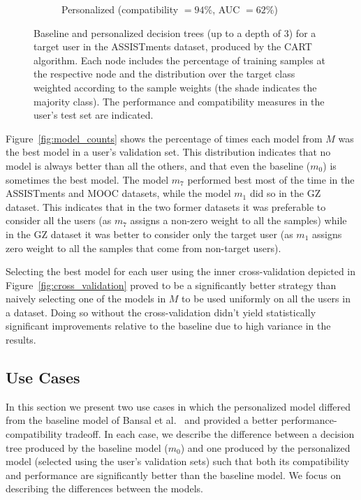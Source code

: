 \documentclass[letterpaper]{article}
\theoremstyle{definition}
\begin{document}
\begin{figure}[t]
\begin{subfigure}[b]{.6\textwidth}
\caption{Personalized (compatibility $=94\%$, AUC $=62\%$)}
\label{fig:assistments_personalized}
\end{subfigure}
\caption{Baseline and personalized decision trees (up to a depth of 3) for a target user in the ASSISTments dataset,  produced by the CART algorithm.  Each node includes  the percentage of training samples at the respective node and the distribution over the target class weighted according to the sample weights (the shade indicates the majority class). The performance and compatibility measures in the user's test set are indicated.}
\label{fig:user_case_assistments}
\end{figure}

Figure~\ref{fig:model_counts} shows the percentage of times each model from $M$ was the best model in a user's validation set. This distribution indicates that no model is always better than all the others, and that even the baseline ($m_0$) is sometimes the best model.
The model $m_7$ performed best most of the time in the ASSISTments and MOOC datasets, while the model $m_1$ did so in the GZ dataset. This indicates that in the two former datasets it was preferable to consider all the users (as $m_7$ assigns a non-zero weight to all the samples) while in the GZ dataset it was better to consider only the target user (as $m_1$ assigns zero weight to all the samples that come from non-target users).

Selecting the best model for each user using the inner cross-validation depicted in Figure~\ref{fig:cross_validation} proved to be a significantly better strategy than naively selecting one of the models in $M$ to be used uniformly on all the users in a dataset. Doing so without the cross-validation didn't yield statistically significant improvements relative to the baseline due to high variance in the results.

\subsection{Use Cases}
\label{sec:user_cases}
In this section we present two use cases in which the personalized model differed from the baseline model of Bansal et al.~ and provided a better performance-compatibility tradeoff.
In each case, we describe the difference between a decision tree produced by the baseline model ($m_0$) and one produced by the personalized model (selected using the user's validation sets) such that both its compatibility and performance are significantly better than the baseline model.
We focus on describing the differences between the models.
\end{document}
